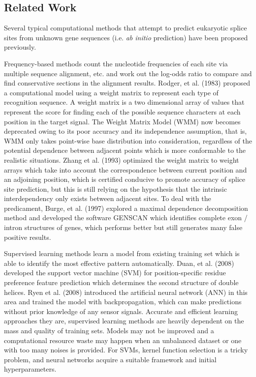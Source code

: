 \documentclass[journal,twoside]{IEEEtran}
\begin{document}
\subsection{Related Work}\label{1.1}

Several typical computational methods that attempt to predict eukaryotic splice sites from unknown gene sequences (i.e. \textsl{ab initio} prediction) have been proposed previously. 

Frequency-based methods count the nucleotide frequencies of each site via multiple sequence alignment, etc. and work out the log-odds ratio to compare and find conservative sections in the alignment results. Rodger, et al. (1983) \cite{staden1984computer} proposed a computational model using a weight matrix to represent each type of recognition sequence. A weight matrix is a two dimensional array of values that represent the score for finding each of the possible sequence characters at each position in the target signal. The Weight Matrix Model (WMM) now becomes deprecated owing to its poor accuracy and its independence assumption, that is, WMM only takes point-wise base distribution into consideration, regardless of the potential dependence between adjacent points which is more conformable to the realistic situations. Zhang et al. (1993) \cite{zhang1993weight} optimized the weight matrix to weight arrays which take into account the correspondence between current position and an adjoining position, which is certified conducive to promote accuracy of splice site prediction, but this is still relying on the hypothesis that the intrinsic interdependency only exists between adjacent sites. To deal with the predicament, Burge, et al. (1997) \cite{burge1997prediction} explored a maximal dependence decomposition method and developed the software GENSCAN which identifies complete exon / intron structures of genes, which performs better but still generates many false positive results. 

Supervised learning methods learn a model from existing training set which is able to identify the most effective pattern automatically. Duan, et al. (2008) \cite{duan2008position} developed the support vector machine (SVM) for position-specific residue preference feature prediction which determines the second structure of double helices. Ryen et al. (2008) \cite{ryen2008splice} introduced the artificial neural network (ANN) in this area and trained the model with backpropagation, which can make predictions without prior knowledge of any sensor signals. Accurate and efficient learning approaches they are, supervised learning methods are heavily dependent on the mass and quality of training sets. Models may not be improved and a computational resource waste may happen when an unbalanced dataset or one with too many noises is provided. For SVMs, kernel function selection is a tricky problem, and neural networks acquire a suitable framework and initial hyperparameters. 
\end{document}
